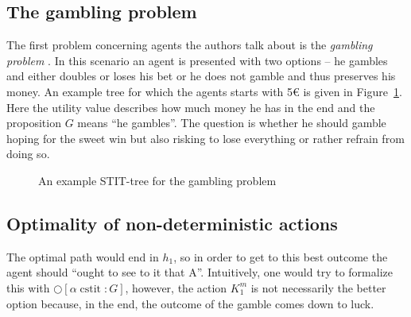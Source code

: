 \documentclass{article}
\newcommand{\cstit}{\operatorname{cstit}}
\begin{document}
\subsection{The gambling problem}
The first problem concerning agents the authors talk about is the \emph{gambling problem} \cite{mdl}. In this scenario an agent is presented with two options -- he gambles and either doubles or loses his bet or he does not gamble and thus preserves his money. An example tree for which the agents starts with 5€ is given in Figure~\ref{fig:gambling-tree}. Here the utility value describes how much money he has in the end and the proposition $G$ means \enquote{he gambles}. The question is whether he should gamble hoping for the sweet win but also risking to lose everything or rather refrain from doing so.

\begin{figure}[ht]
    \centering
    \caption{An example STIT-tree for the gambling problem}
    \label{fig:gambling-tree}
\end{figure}

\subsection{Optimality of non-deterministic actions}
The optimal path would end in $h_1$, so in order to get to this best outcome the agent should \enquote{ought to see to it that A}. Intuitively, one would try to formalize this with $\bigcirc[\alpha \cstit \colon G]$, however, the action $K^m_1$ is not necessarily the better option because, in the end, the outcome of the gamble comes down to luck. 
\end{document}
